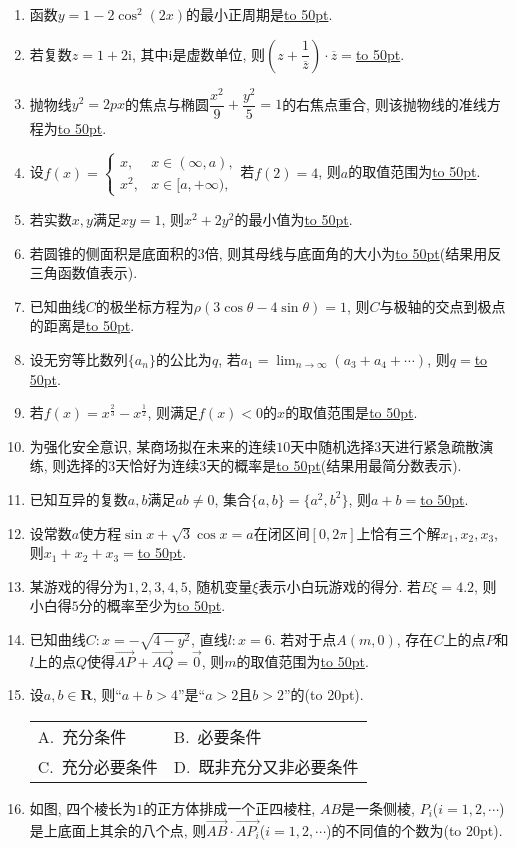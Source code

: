 \documentclass[10pt,a4paper]{article}
\newcommand{\blank}[1]{\underline{\hbox to #1pt{}}}
\newcommand{\bracket}[1]{(\hbox to #1pt{})}
\newcommand{\twoch}[4]{\par\begin{tabular}{p{.46\textwidth}p{.46\textwidth}}
A.~#1& B.~#2\\
C.~#3& D.~#4
\end{tabular}}
\begin{document}
\begin{enumerate}[1.]
\item 函数$y=1-2\cos ^2(2x)$的最小正周期是\blank{50}.
\item 若复数$z=1+2\mathrm{i}$, 其中$\mathrm{i}$是虚数单位, 则$(z+\dfrac 1{\overline z})\cdot \overline z=$\blank{50}.
\item 抛物线$y^2=2px$的焦点与椭圆$\dfrac{x^2}{9}+\dfrac{y^2}{5}=1$的右焦点重合, 则该抛物线的准线方程为\blank{50}.
\item 设$f(x)=\begin{cases}x, & x\in (\infty,a),\\ x^2, & x\in [a,+\infty),\end{cases}$若$f(2)=4$, 则$a$的取值范围为\blank{50}.
\item 若实数$x,y$满足$xy=1$, 则$x^2+2y^2$的最小值为\blank{50}.
\item 若圆锥的侧面积是底面积的$3$倍, 则其母线与底面角的大小为\blank{50}(结果用反三角函数值表示).
\item 已知曲线$C$的极坐标方程为$\rho(3\cos\theta-4\sin\theta)=1$, 则$C$与极轴的交点到极点的距离是\blank{50}.
\item 设无穷等比数列$\{a_n\}$的公比为$q$, 若$a_1=\displaystyle\lim_{n\to \infty}(a_3+a_4+\cdots)$, 则$q=$\blank{50}.
\item 若$f(x)=x^\frac 23-x^\frac 12$, 则满足$f(x)<0$的$x$的取值范围是\blank{50}.
\item 为强化安全意识, 某商场拟在未来的连续$10$天中随机选择$3$天进行紧急疏散演练, 则选择的$3$天恰好为连续$3$天的概率是\blank{50}(结果用最简分数表示).
\item 已知互异的复数$a, b$满足$ab\ne 0$, 集合$\{a, b\}=\{a^2,b^2\}$, 则$a+b=$\blank{50}.
\item 设常数$a$使方程$\sin x+\sqrt{3}\cos x=a$在闭区间$[0, 2\pi]$上恰有三个解$x_1,x_2,x_3$, 则$x_1+x_2+x_3=$\blank{50}.
\item 某游戏的得分为$1, 2, 3, 4, 5$, 随机变量$\xi$表示小白玩游戏的得分. 若$E\xi = 4.2$, 则小白得$5$分的概率至少为\blank{50}.
\item 已知曲线$C:x=-\sqrt{4-y^2}$, 直线$l: x=6$. 若对于点$A(m, 0)$, 存在$C$上的点$P$和$l$上的点$Q$使得$\overrightarrow{AP}+\overrightarrow{AQ}=\overrightarrow 0$, 则$m$的取值范围为\blank{50}.
\item 设$a,b\in \mathbf{R}$, 则``$a+b>4$''是``$a>2$且$b>2$''的\bracket{20}.
\twoch{充分条件}{必要条件}{充分必要条件}{既非充分又非必要条件}
\item 如图, 四个棱长为$1$的正方体排成一个正四棱柱, $AB$是一条侧棱, $P_i$($i=1,2,\cdots$)是上底面上其余的八个点, 则$\overrightarrow{AB}\cdot \overrightarrow{AP_i}$($i=1,2,\cdots$)的不同值的个数为\bracket{20}.

\end{enumerate}
\end{document}
